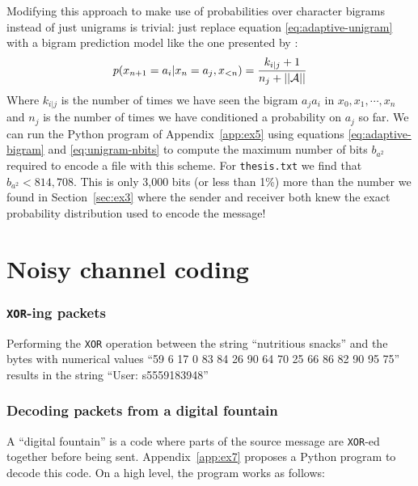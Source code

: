 \documentclass[10pt,a4paper,oneside,onecolumn]{article}
\newcommand*{\thesisTXT}{{\tt thesis.txt}\xspace}
\newcommand*{\XOR}{{\tt XOR}\xspace}
\newcommand*{\norm}[1]{\ensuremath{\left|\left|#1\right|\right|}}
\newcommand*{\textapprox}{\raisebox{0.5ex}{\texttildelow}}
\begin{document}
Modifying this approach to make use of probabilities over character bigrams
instead of just unigrams is trivial: just replace equation
\eqref{eq:adaptive-unigram} with a bigram prediction model like the one
presented by \cite[p.~3]{it-assign}:
\begin{equation}\label{eq:adaptive-bigram}
    p(x_{n+1}=a_i|x_{n} = a_j, x_{<n})
    = {k_{i|j} + 1 \over n_j + \norm{\mathcal{A}}}
\end{equation}
Where $k_{i|j}$ is the number of times we have seen the bigram $a_ja_i$ in
$x_0, x_1, \cdots, x_n$ and $n_j$ is the number of times we have conditioned a
probability on $a_j$ so far.
We can run the Python program of Appendix~\ref{app:ex5} using equations
\eqref{eq:adaptive-bigram} and \eqref{eq:unigram-nbits} to compute the maximum
number of bits $b_{a^2}$ required to encode a file with this scheme. For
\thesisTXT we find that $b_{a^2} < 814,708$. This is only \textapprox 3,000 bits
(or less than 1\%) more than the number we found in Section~\ref{sec:ex3} where
the sender and receiver both knew the exact probability distribution used to
encode the message!


\part{Noisy channel coding}


\section{\XOR-ing packets}\label{sec:ex6}

Performing the \XOR operation between the string ``nutritious snacks'' and the
bytes with numerical values ``59 6 17 0 83 84 26 90 64 70 25 66 86 82 90 95 75''
results in the string ``User: s5559183948''


\section{Decoding packets from a digital fountain}\label{sec:ex7}

A ``digital fountain'' is a code where parts of the source message are \XOR-ed
together before being sent. Appendix~\ref{app:ex7} proposes a Python program to
decode this code. On a high level, the program works as follows:
\end{document}
